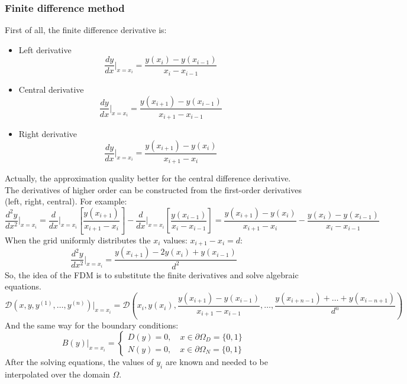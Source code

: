 \subsubsection{Finite difference method}
First of all, the finite difference derivative is:
\begin{itemize}
	\item Left derivative \begin{equation}
		\label{eq:left_der}
		\dfrac{d y}{d x} \Big|_{x = x_i} = \dfrac{y(x_i) - y(x_{i - 1})}{x_i - x_{i - 1}}
	\end{equation}
	\item Central derivative \begin{equation}
		\label{eq:central_der}
		\dfrac{d y}{d x} \Big|_{x = x_i} = \dfrac{y(x_{i + 1}) - y(x_{i - 1})}{x_{i + 1} - x_{i - 1}}
	\end{equation}
	\item Right derivative \begin{equation}
		\label{eq:right_der}
		\dfrac{d y}{d x} \Big|_{x = x_i} = \dfrac{y(x_{i + 1}) - y(x_i)}{x_{i + 1} - x_i}
	\end{equation}
\end{itemize}
Actually, the approximation quality better for the central difference derivative. The derivatives of higher order can be constructed from the first-order derivatives (left, right, central). For example:
\begin{equation*}
	\dfrac{d^2 y}{d x^2} \Big|_{x = x_i} = \dfrac{d}{d x} \Big|_{x = x_i} \left [ \dfrac{y(x_{i + 1})}{x_{i + 1} - x_i} \right ] - \dfrac{d}{d x} \Big|_{x = x_i} \left [ \dfrac{y(x_{i - 1})}{x_i - x_{i - 1}} \right ] = \dfrac{y(x_{i + 1}) - y(x_i)}{x_{i + 1} - x_i} - \dfrac{y(x_i) - y(x_{i - 1})}{x_i - x_{i - 1}}
\end{equation*}
When the grid uniformly distributes the $x_i$ values: $x_{i + 1} - x_i = d$:
\begin{equation*}
	\dfrac{d^2 y}{d x^2} \Big|_{x = x_i} = \dfrac{y(x_{i + 1}) - 2 y(x_i) + y(x_{i - 1})}{d^2}
\end{equation*}
So, the idea of the FDM is to substitute the finite derivatives and solve algebraic equations. 
\begin{equation*}
	\mathcal{D} (x, y, y^{(1)}, \dots, y^{(n)}) \Big|_{x = x_i} = \mathcal{D} \left ( x_i, y(x_i), \dfrac{y(x_{i + 1}) - y(x_{i - 1})}{x_{i + 1} - x_{i - 1}}, \dots, \dfrac{y(x_{i + n - 1}) + \dots + y(x_{i - n + 1})}{d^n} \right )
\end{equation*}
And the same way for the boundary conditions:
\begin{equation*}
	B(y) \Big|_{x = x_i}  = \begin{cases}
		D(y) = 0, \quad x \in \partial \Omega_D = \{0, 1\} \\
		N(y) = 0, \quad x \in \partial \Omega_N = \{0, 1\} 
	\end{cases} 
\end{equation*}
After the solving equations, the values of $y_i$ are known and needed to be interpolated over the domain $\Omega$.
